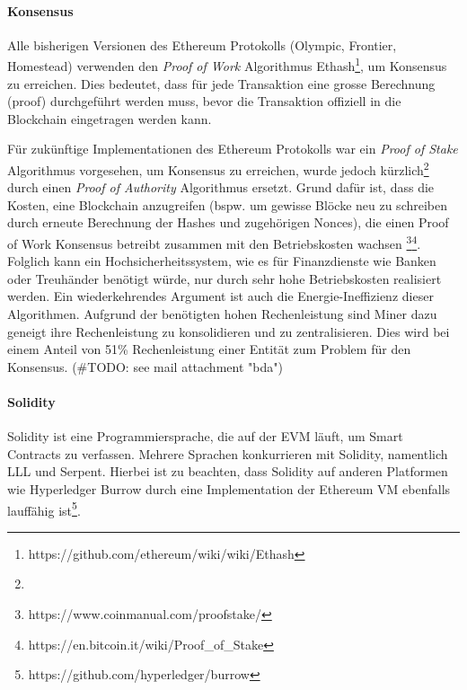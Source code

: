 \paragraph{Konsensus}
Alle bisherigen Versionen des Ethereum Protokolls (Olympic, Frontier, Homestead) verwenden den \emph{Proof of Work} Algorithmus Ethash\footnote{https://github.com/ethereum/wiki/wiki/Ethash}, um Konsensus zu erreichen. Dies bedeutet, dass für jede Transaktion eine grosse Berechnung (proof) durchgeführt werden muss, bevor die Transaktion offiziell in die Blockchain eingetragen werden kann.

Für zukünftige Implementationen des Ethereum Protokolls war ein \emph{Proof of Stake} Algorithmus vorgesehen, um Konsensus zu erreichen, wurde jedoch kürzlich\footnote{} durch einen \emph{Proof of Authority} Algorithmus ersetzt. Grund dafür ist, dass die Kosten, eine Blockchain anzugreifen (bspw. um gewisse Blöcke neu zu schreiben durch erneute Berechnung der Hashes und zugehörigen Nonces), die einen Proof of Work Konsensus betreibt zusammen mit den Betriebskosten wachsen \footnote{https://www.coinmanual.com/proof\-stake/}\footnote{https://en.bitcoin.it/wiki/Proof\_of\_Stake}. Folglich kann ein Hochsicherheitssystem, wie es für Finanzdienste wie Banken oder Treuhänder benötigt würde, nur durch sehr hohe Betriebskosten realisiert werden. Ein wiederkehrendes Argument ist auch die Energie-Ineffizienz dieser Algorithmen. Aufgrund der benötigten hohen Rechenleistung sind Miner dazu geneigt ihre Rechenleistung zu konsolidieren und zu zentralisieren. Dies wird bei einem Anteil von 51\% Rechenleistung einer Entität zum Problem für den Konsensus. (\#TODO: see mail attachment "bda")

\paragraph{Solidity}
Solidity ist eine Programmiersprache, die auf der \acrfull{EVM} läuft, um Smart Contracts zu verfassen. Mehrere Sprachen konkurrieren mit Solidity, namentlich LLL und Serpent. Hierbei ist zu beachten, dass Solidity auf anderen Platformen wie Hyperledger Burrow durch eine Implementation der Ethereum VM ebenfalls lauffähig ist\footnote{https://github.com/hyperledger/burrow}.

